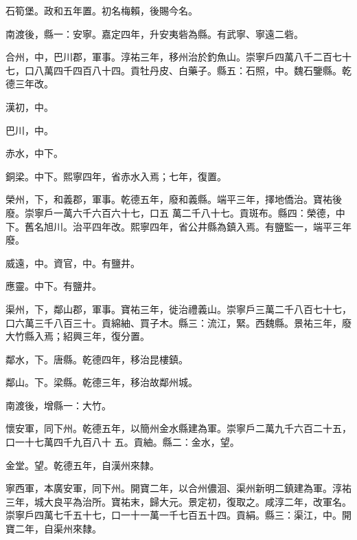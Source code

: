 \begin{pinyinscope}
 石筍堡。政和五年置。初名梅賴，後賜今名。



 南渡後，縣一：安寧。嘉定四年，升安夷砦為縣。有武寧、寧遠二砦。



 合州，中，巴川郡，軍事。淳祐三年，移州治於釣魚山。崇寧戶四萬八千二百七十七，口八萬四千四百八十四。貢牡丹皮、白藥子。縣五：石照，中。魏石鑒縣。乾德三年改。



 漢初，中。



 巴川，中。



 赤水，中下。



 銅梁。中下。熙寧四年，省赤水入焉；七年，復置。



 榮州，下，和義郡，軍事。乾德五年，廢和義縣。端平三年，擇地僑治。寶祐後廢。崇寧戶一萬六千六百六十七，口五
 萬二千八十七。貢斑布。縣四：榮德，中下。舊名旭川。治平四年改。熙寧四年，省公井縣為鎮入焉。有鹽監一，端平三年廢。



 威遠，中。資官，中。有鹽井。



 應靈。中下。有鹽井。



 渠州，下，鄰山郡，軍事。寶祐三年，徙治禮義山。崇寧戶三萬二千八百七十七，口六萬三千八百三十。貢綿紬、買子木。縣三：流江，緊。西魏縣。景祐三年，廢大竹縣入焉；紹興三年，復分置。



 鄰水，下。唐縣。乾德四年，移治昆樓鎮。



 鄰山。下。梁縣。乾德三年，移治故鄰州城。



 南渡後，增縣一：大竹。



 懷安軍，同下州。乾德五年，以簡州金水縣建為軍。崇寧戶二萬九千六百二十五，口一十七萬四千九百八十
 五。貢紬。縣二：金水，望。



 金堂。望。乾德五年，自漢州來隸。



 寧西軍，本廣安軍，同下州。開寶二年，以合州儂洄、渠州新明二鎮建為軍。淳祐三年，城大良平為治所。寶祐末，歸大元。景定初，復取之。咸淳二年，改軍名。崇寧戶四萬七千五十七，口一十一萬一千七百五十四。貢絹。縣三：渠江，中。開寶二年，自渠州來隸。




\end{pinyinscope}
